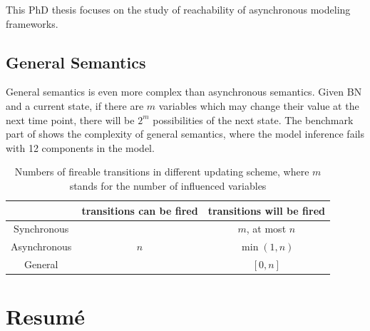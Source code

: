 This PhD thesis focuses on the study of reachability of asynchronous modeling frameworks.
\subsection{General Semantics}
General semantics is even more complex than asynchronous semantics.
Given BN and a current state, if there are $m$ variables which may change their value at the next time point, there will be $2^m$ possibilities of the next state.
The benchmark part of \cite{ribeiro2018learning} shows the complexity of general semantics, where the model inference fails with 12 components in the model. 
\begin{table}[ht]
    \centering
    \begin{tabular}{c|c|c}
            &transitions can be fired&transitions will be fired\\
            \hline
         Synchronous & \multirow{3}{*}{$n$} & $m$, at most $n$\\\cline{1-1} \cline{3-3}
            
         Asynchronous & & $\min(1,n)$\\ \cline{1-1} \cline{3-3}
            
         General &  & $[0,n]$
    \end{tabular}
    \caption[Update schemes]{Numbers of fireable transitions in different updating scheme, where $m$ stands for the number of influenced variables}
    \label{tab:semantics}
\end{table}

\section{Resum\'e}